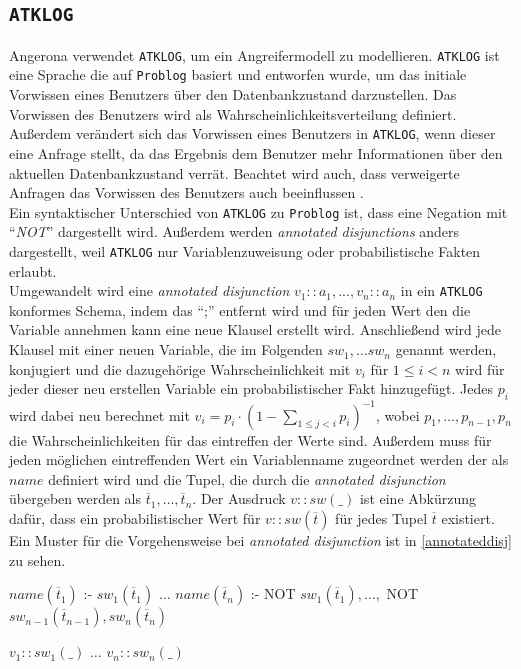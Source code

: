 \documentclass[german,version-2020-11]{uzl-thesis}
\begin{document}
\subsection{\texttt{ATKLOG}} \label{sub:atklog}
Angerona verwendet \texttt{ATKLOG}, um ein Angreifermodell zu modellieren. \texttt{ATKLOG} ist eine Sprache die auf \texttt{Problog} basiert und entworfen wurde, um das initiale Vorwissen eines Benutzers über den Datenbankzustand darzustellen. Das Vorwissen des Benutzers wird als Wahrscheinlichkeitsverteilung definiert. Außerdem verändert sich das Vorwissen eines Benutzers in \texttt{ATKLOG}, wenn dieser eine Anfrage stellt, da das Ergebnis dem Benutzer mehr Informationen über den aktuellen Datenbankzustand verrät. Beachtet wird auch, dass verweigerte Anfragen das Vorwissen des Benutzers auch beeinflussen \cite{guarnieri2017securing}. \\ 
Ein syntaktischer Unterschied von \texttt{ATKLOG} zu \texttt{Problog} ist, dass eine Negation mit \enquote{\textit{NOT}} dargestellt wird. Außerdem werden \textit{annotated disjunctions} anders dargestellt, weil \texttt{ATKLOG} nur Variablenzuweisung oder probabilistische Fakten erlaubt. \\ Umgewandelt wird eine \textit{annotated disjunction} $v_1::a_1, ..., v_n::a_n$ in ein \texttt{ATKLOG} konformes Schema, indem das \enquote{;} entfernt wird und für jeden Wert den die Variable annehmen kann eine neue Klausel erstellt wird. Anschließend wird jede Klausel mit einer neuen Variable, die im Folgenden $sw_1, \dots sw_n$ genannt werden, konjugiert und die dazugehörige Wahrscheinlichkeit mit $v_i$ für $1 \leq i < n$ wird für jeder dieser neu erstellen Variable ein probabilistischer Fakt hinzugefügt. Jedes $p_i$ wird dabei neu berechnet mit $v_i = p_i \cdot (1 - \sum_{1\leq j<i}p_i)^{-1}$, wobei $p_1, \dots ,p_{n-1}, p_n$ die Wahrscheinlichkeiten für das eintreffen der Werte sind.
Außerdem muss für jeden möglichen eintreffenden Wert ein Variablenname zugeordnet werden der als $name$ definiert wird und die Tupel, die durch die \textit{annotated disjunction} übergeben werden als $\overline{t}_1 , \dots , \overline{t}_n$. Der Ausdruck $v::sw(\_)$ ist eine Abkürzung dafür, dass ein probabilistischer Wert für $v::sw(\overline{t})$ für jedes Tupel $\overline{t}$ existiert. Ein Muster für die Vorgehensweise bei \textit{annotated disjunction} ist in \autoref{annotateddisj} zu sehen.
\begin{Pseudocode}[caption={Vorgehensweise bei \textit{annotated disjunction}}, label={annotateddisj}, numbers=left]
$name(\overline{t}_1)$ :- $sw_1(\overline{t}_1)$
$\dots$
$name(\overline{t}_n)$ :- NOT $sw_1(\overline{t}_1), \dots ,$ NOT $sw_{n−1}(\overline{t}_{n−1}), sw_n(\overline{t}_n)$
	
$v_1::sw_1(\_)$
$\dots$
$v_n::sw_n(\_)$
\end{Pseudocode} 
\end{document}
